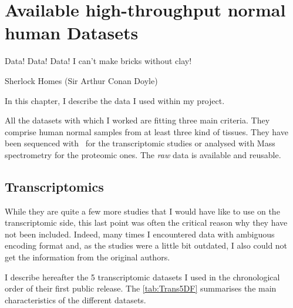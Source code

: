 \chapter{Available high-throughput normal human Datasets}
\label{ch:datasets}

\setlength{\epigraphwidth}{0.57\textwidth}
\setlength{\epigraphrule}{0.1pt}
\epigraph{Data! Data! Data! I can’t make bricks without clay!}{Sherlock Homes
(Sir Arthur Conan Doyle)}


In this chapter, I describe the data I used within my project.

All the datasets with which I worked are fitting three main criteria.
They comprise human normal samples from at least three kind of tissues.
They have been sequenced with \Rnaseq\ for the transcriptomic studies or
analysed with Mass spectrometry for the proteomic ones.
The \emph{raw} data is available and reusable.


\section{Transcriptomics}

While they are quite a few more studies that I would have like to use on the
transcriptomic side, this last point was often the critical reason
why they have not been included.
Indeed, many times I encountered data with ambiguous encoding format and, as the
studies were a little bit outdated,
I also could not get the information from the original authors.

I describe hereafter the 5 transcriptomic datasets I used
in the chronological order of their first public release.
The \cref{tab:Trans5DF} summarises the main characteristics of the different
datasets.


